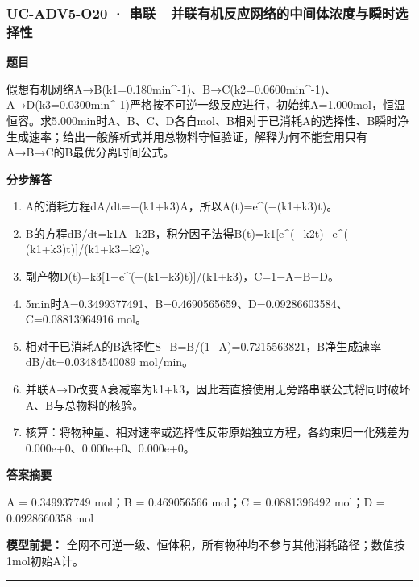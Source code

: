\documentclass[UTF8,11pt,a4paper]{ctexart}
\begin{document}
\subsubsection*{UC-ADV5-O20 · 串联—并联有机反应网络的中间体浓度与瞬时选择性}
\noindent\textbf{题目}\par
假想有机网络A→B(k1=0.180min\textasciicircum{}-1)、B→C(k2=0.0600min\textasciicircum{}-1)、A→D(k3=0.0300min\textasciicircum{}-1)严格按不可逆一级反应进行，初始纯A=1.000mol，恒温恒容。求5.000min时A、B、C、D各自mol、B相对于已消耗A的选择性、B瞬时净生成速率；给出一般解析式并用总物料守恒验证，解释为何不能套用只有A→B→C的B最优分离时间公式。\par
\medskip\noindent\textbf{分步解答}
\begin{enumerate}
\item A的消耗方程dA/dt=−(k1+k3)A，所以A(t)=e\textasciicircum{}(−(k1+k3)t)。
\item B的方程dB/dt=k1A−k2B，积分因子法得B(t)=k1[e\textasciicircum{}(−k2t)−e\textasciicircum{}(−(k1+k3)t)]/(k1+k3−k2)。
\item 副产物D(t)=k3[1−e\textasciicircum{}(−(k1+k3)t)]/(k1+k3)，C=1−A−B−D。
\item 5min时A=0.3499377491、B=0.4690565659、D=0.09286603584、C=0.08813964916 mol。
\item 相对于已消耗A的B选择性S\_B=B/(1−A)=0.7215563821，B净生成速率dB/dt=0.03484540089 mol/min。
\item 并联A→D改变A衰减率为k1+k3，因此若直接使用无旁路串联公式将同时破坏A、B与总物料的核验。
\item 核算：将物种量、相对速率或选择性反带原始独立方程，各约束归一化残差为 0.000e+0、0.000e+0、0.000e+0。
\end{enumerate}
\noindent\textbf{答案摘要}\par
A = 0.349937749 mol；B = 0.469056566 mol；C = 0.0881396492 mol；D = 0.0928660358 mol\par
\noindent\textbf{模型前提：}
全网不可逆一级、恒体积，所有物种均不参与其他消耗路径；数值按1mol初始A计。\par
\medskip\hrule\medskip
{}
\end{document}
